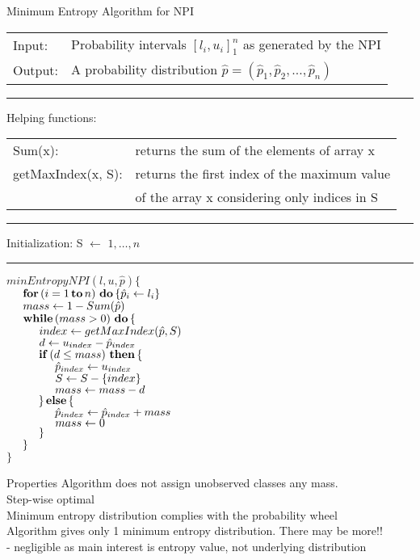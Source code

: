 \documentclass{beamer}
\theoremstyle{definition} \newtheorem{llemma}{Lemma}
\newcommand{\FORLOOP}[2]{\mathbf{for} \left(#1 \,\mathbf{to}\, #2\right)\, \mathbf{do} \,}
\newcommand{\WHILE}[1]{\mathbf{while} \left(#1 \right)\, \mathbf{do} \,}
\newcommand{\IFTHEN}[1]{\mathbf{if}\left(#1\right)\,\mathbf{then}\,\{ }
\newcommand{\ELSE}{\}\,\mathbf{else}\,\{ }
\newcommand{\STATE}{\hspace*{0.5cm}}
\begin{document}
\begin{frame}{Minimum Entropy Algorithm for NPI}
\begin{scriptsize}
\begin{tabular}{ll}
Input: & Probability intervals ${[l_i, u_i]}^n_1$ as generated by the NPI\\
Output: & A probability distribution $\hat{p} = (\hat{p}_1, \hat{p}_2, \ldots , \hat{p}_n)$\\
\end{tabular}
\rule{\textwidth}{0.2mm}
Helping functions:\\
\begin{tabular}{ll}
Sum(x): & returns the sum of the elements of array x\\
getMaxIndex(x, S): & returns the first index of the maximum value\\
& of the array x considering only indices in S\\
\end{tabular}
\rule{\textwidth}{0.2mm}
Initialization:
S $\leftarrow$ ${1, \ldots, n}$\\[-0.8em]
\rule{\textwidth}{0.2mm}
$minEntropyNPI(l, u, \hat{p}) \{$\\
$\STATE\FORLOOP{i= 1}{n} \{\hat{p}_i \leftarrow l_i\}$\\
$\STATE mass \leftarrow 1 - Sum(\hat{p})$\\
$\STATE\WHILE{mass > 0} \{$\\
$\STATE\STATE index \leftarrow getMaxIndex(\hat{p}, S)$\\
$\STATE\STATE d \leftarrow u_{index} - \hat{p}_{index}$\\
$\STATE\STATE\IFTHEN{d \leq mass}$\\
$\STATE\STATE\STATE \hat{p}_{index} \leftarrow u_{index}$\\
$\STATE\STATE\STATE S \leftarrow S - \{index\}$\\
$\STATE\STATE\STATE mass \leftarrow mass - d$\\
$\STATE\STATE\ELSE$\\
$\STATE\STATE\STATE \hat{p}_{index} \leftarrow \hat{p}_{index} + mass$\\
$\STATE\STATE\STATE mass \leftarrow 0$\\
$\STATE\STATE\}$\\
$\STATE\}$\\
$\}$
\end{scriptsize}
\end{frame}

\begin{frame}{Properties}
Algorithm does not assign unobserved classes any mass.\\[1em]
Step-wise optimal\\[1em]
Minimum entropy distribution complies with the probability wheel\\[1em]
Algorithm gives only 1 minimum entropy distribution. There may be more!!\\[0.4em]
- negligible as main interest is entropy value, not underlying distribution\\
\end{frame}
\end{document}
